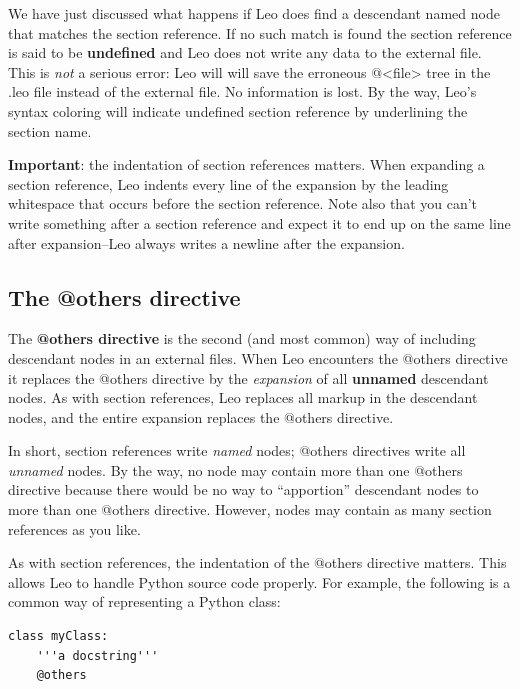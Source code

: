 \documentclass[a4paper,10pt,english]{sphinxmanual}
\begin{document}
We have just discussed what happens if Leo does find a descendant named node
that matches the section reference. If no such match is found the section
reference is said to be \textbf{undefined} and Leo does not write any data to the
external file. This is \emph{not} a serious error: Leo will will save the erroneous
@\textless{}file\textgreater{} tree in the .leo file instead of the external file. No information is
lost. By the way, Leo's syntax coloring will indicate undefined section
reference by underlining the section name.

\textbf{Important}: the indentation of section references matters. When expanding a
section reference, Leo indents every line of the expansion by the leading
whitespace that occurs before the section reference. Note also that you can't
write something after a section reference and expect it to end up on the same
line after expansion--Leo always writes a newline after the expansion.


\subsection{The @others directive}
\label{intro:the-others-directive}
The \textbf{@others directive} is the second (and most common) way of including
descendant nodes in an external files. When Leo encounters the @others
directive it replaces the @others directive by the \emph{expansion} of all
\textbf{unnamed} descendant nodes. As with section references, Leo replaces all
markup in the descendant nodes, and the entire expansion replaces the @others
directive.

In short, section references write \emph{named} nodes; @others directives write all
\emph{unnamed} nodes. By the way, no node may contain more than one @others
directive because there would be no way to ``apportion'' descendant nodes to more
than one @others directive. However, nodes may contain as many section
references as you like.

As with section references, the indentation of the @others directive matters.
This allows Leo to handle Python source code properly. For example, the following
is a common way of representing a Python class:

\begin{Verbatim}[commandchars=\\\{\}]
class myClass:
    '''a docstring'''
    @others
\end{Verbatim}
\end{document}

